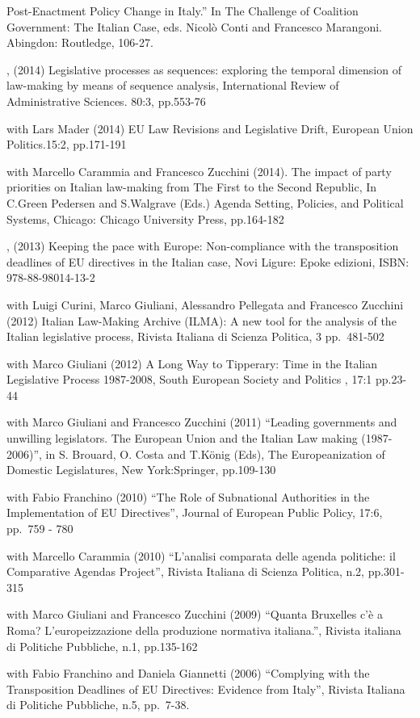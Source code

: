 \documentclass[11pt,]{article}
\renewenvironment{itemize}{
  \begin{list}{}{
    \setlength{\leftmargin}{1.5em}
  }
}{
  \end{list}
}
\begin{document}
\begin{itemize}
  Post-Enactment Policy Change in Italy.'' In The Challenge of Coalition
  Government: The Italian Case, eds. Nicolò Conti and Francesco
  Marangoni. Abingdon: Routledge, 106-27.
\item
  , (2014) Legislative processes as sequences: exploring the temporal
  dimension of law-making by means of sequence analysis, International
  Review of Administrative Sciences. 80:3, pp.553-76
\item
  with Lars Mader (2014) EU Law Revisions and Legislative Drift,
  European Union Politics.15:2, pp.171-191
\item
  with Marcello Carammia and Francesco Zucchini (2014). The impact of
  party priorities on Italian law-making from The First to the Second
  Republic, In C.Green Pedersen and S.Walgrave (Eds.) Agenda Setting,
  Policies, and Political Systems, Chicago: Chicago University Press,
  pp.164-182
\item
  , (2013) Keeping the pace with Europe: Non-compliance with the
  transposition deadlines of EU directives in the Italian case, Novi
  Ligure: Epoke edizioni, ISBN: 978-88-98014-13-2
\item
  with Luigi Curini, Marco Giuliani, Alessandro Pellegata and Francesco
  Zucchini (2012) Italian Law-Making Archive (ILMA): A new tool for the
  analysis of the Italian legislative process, Rivista Italiana di
  Scienza Politica, 3 pp.~481-502
\item
  with Marco Giuliani (2012) A Long Way to Tipperary: Time in the
  Italian Legislative Process 1987-2008, South European Society and
  Politics , 17:1 pp.23-44
\item
  with Marco Giuliani and Francesco Zucchini (2011) ``Leading
  governments and unwilling legislators. The European Union and the
  Italian Law making (1987-2006)'', in S. Brouard, O. Costa and T.König
  (Eds), The Europeanization of Domestic Legislatures, New
  York:Springer, pp.109-130
\item
  with Fabio Franchino (2010) ``The Role of Subnational Authorities in
  the Implementation of EU Directives'', Journal of European Public
  Policy, 17:6, pp.~759 - 780
\item
  with Marcello Carammia (2010) ``L'analisi comparata delle agenda
  politiche: il Comparative Agendas Project'', Rivista Italiana di
  Scienza Politica, n.2, pp.301-315
\item
  with Marco Giuliani and Francesco Zucchini (2009) ``Quanta Bruxelles
  c'è a Roma? L'europeizzazione della produzione normativa italiana.'',
  Rivista italiana di Politiche Pubbliche, n.1, pp.135-162
\item
  with Fabio Franchino and Daniela Giannetti (2006) ``Complying with the
  Transposition Deadlines of EU Directives: Evidence from Italy'',
  Rivista Italiana di Politiche Pubbliche, n.5, pp.~7-38.
\end{itemize}
\end{document}
